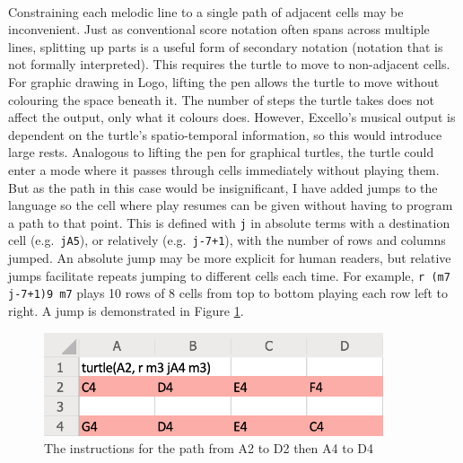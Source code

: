 \paragraph{} Constraining each melodic line to a single path of adjacent cells may be inconvenient. Just as conventional score notation often spans across multiple lines, splitting up parts is a useful form of secondary notation (notation that is not formally interpreted). This requires the turtle to move to non-adjacent cells. For graphic drawing in Logo, lifting the pen allows the turtle to move without colouring the space beneath it. The number of steps the turtle takes does not affect the output, only what it colours does. However, Excello's musical output is dependent on the turtle's spatio-temporal information, so this would introduce large rests. Analogous to lifting the pen for graphical turtles, the turtle could enter a mode where it passes through cells immediately without playing them. But as the path in this case would be insignificant, I have added jumps to the language so the cell where play resumes can be given without having to program a path to that point. This is defined with \texttt{j} in absolute terms with a destination cell (e.g.~\texttt{jA5}), or relatively (e.g.~\texttt{j-7+1}), with the number of rows and columns jumped. An absolute jump may be more explicit for human readers, but relative jumps facilitate repeats jumping to different cells each time. For example, \texttt{r (m7 j-7+1)9 m7} plays 10 rows of 8 cells from top to bottom playing each row left to right. A jump is demonstrated in Figure \ref{prep:language2}.

\begin{figure}[ht]
  \centerline{\includegraphics[width=100mm]{figs/sheetDiss2.png}}
\caption{The instructions for the path from A2 to D2 then A4 to D4}
\label{prep:language2}
\end{figure}
\vspace{-20pt}


